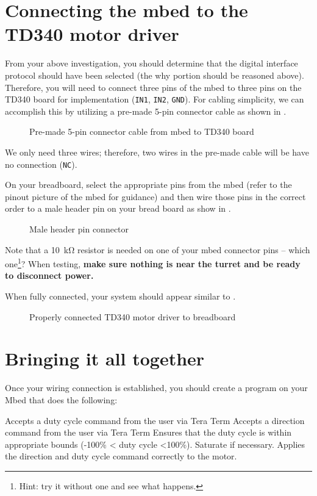 \documentclass{exam}
\begin{document}
\section{Connecting the mbed to the TD340 motor driver}
From your above investigation, you should determine that the digital interface protocol should have been selected (the why portion should be reasoned above). Therefore, you will need to connect three pins of the mbed to three pins on the TD340 board for implementation (\lstinline{IN1}, \lstinline{IN2}, \lstinline{GND}). For cabling simplicity, we can accomplish this by utilizing a pre-made 5-pin connector cable as shown in .
\begin{figure}[h]
\caption{Pre-made 5-pin connector cable from mbed to TD340 board}
\label{fig:3}
\end{figure}
We only need three wires; therefore, two wires in the pre-made cable will be have no connection (\lstinline{NC}).

On your breadboard, select the appropriate pins from the mbed (refer to the pinout picture of the mbed for guidance) and then wire those pins in the correct order to a male header pin on your bread board as show in .  
\begin{figure}
\caption{Male header pin connector}
\label{fig:4}
\end{figure}

Note that a \SI{10}{\kilo\ohm} resistor is needed on one of your mbed connector pins -- which one\footnote{Hint: try it without one and see what happens.}?  When testing, \textbf{make sure nothing is near the turret and be ready to disconnect power.}

When fully connected, your system should appear similar to .
\begin{figure}
\caption{Properly connected TD340 motor driver to breadboard}
\label{fig:5}
\end{figure}





\section{Bringing it all together}
Once your wiring connection is established, you should create a program on your Mbed that does the following:
\begin{questions}
\question Accepts a duty cycle command from the user via Tera Term
\question Accepts a direction command from the user via Tera Term
\question Ensures that the duty cycle is within appropriate bounds (-100\% < duty cycle <100\%). Saturate if necessary.
\question Applies the direction and duty cycle command correctly to the motor.
\end{questions}
\end{document}
